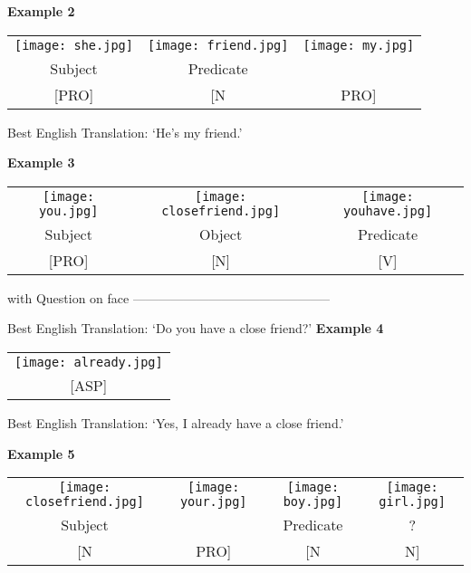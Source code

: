\documentclass{tufte-book}
\begin{document}
\vspace{0.25cm}\noindent \textbf{Example 2}
\begin{table*}[h!]
\begin{tabular}{c | c c}
\texttt{[image: she.jpg]}&\texttt{[image: friend.jpg]}&\texttt{[image: my.jpg]}\\
\footnotesize Subject &  \footnotesize Predicate &\\
\footnotesize [PRO] & \footnotesize [N & \footnotesize PRO]\\
\end{tabular}
\end{table*}

Best English Translation: `He's my friend.'

\vspace{0.25cm}\noindent \textbf{Example 3}
\begin{table*}[h!]
\begin{tabular}{c | c| c}
\texttt{[image: you.jpg]}&\texttt{[image: closefriend.jpg]}&\texttt{[image: youhave.jpg]}\\
\footnotesize Subject & \footnotesize Object & \footnotesize Predicate\\
\footnotesize [PRO] & \footnotesize [N] & \footnotesize [V]\\
\end{tabular}
\end{table*}

\noindent with Question on face -----------------------------------------------

Best English Translation: `Do you have a close friend?'
\newpage
\noindent \textbf{Example 4}
\begin{table*}[h!]
\begin{tabular}{c}
\texttt{[image: already.jpg]}\\
\footnotesize [ASP] \\
\end{tabular}
\end{table*}

Best English Translation: `Yes, I already have a close friend.'

\vspace{0.25cm}\noindent \textbf{Example 5}
\begin{table*}[h!]
\begin{tabular}{c  c| c c}
\texttt{[image: closefriend.jpg]}&\texttt{[image: your.jpg]}&\texttt{[image: boy.jpg]}&\texttt{[image: girl.jpg]}\\
\footnotesize Subject &  & \footnotesize Predicate & \footnotesize ?\\
\footnotesize [N & \footnotesize PRO] & \footnotesize [N & \footnotesize N]\\
\end{tabular}
\end{table*}
\end{document}
